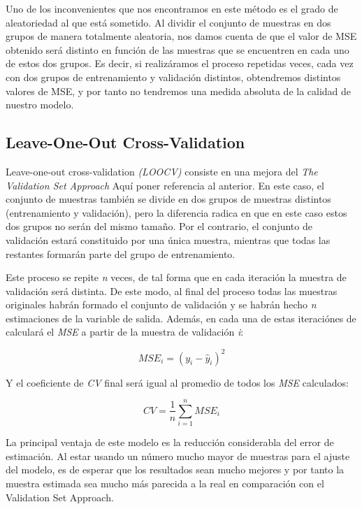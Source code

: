\documentclass[12pt,a4paper,Spanish]{book}
\begin{document}
Uno de los inconvenientes que nos encontramos en este método es el grado de aleatoriedad al que está sometido. Al dividir el conjunto de muestras en dos grupos de manera totalmente aleatoria, nos damos cuenta de que el valor de MSE obtenido será distinto en función de las muestras que se encuentren en cada uno de estos dos grupos. Es decir, si realizáramos el proceso repetidas veces, cada vez con dos grupos de entrenamiento y validación distintos, obtendremos distintos valores de MSE, y por tanto no tendremos una medida absoluta de la calidad de nuestro modelo.


\subsection{Leave-One-Out Cross-Validation}

Leave-one-out cross-validation \textit{(LOOCV)} consiste en una mejora del \textit{The Validation Set Approach} Aquí poner referencia al anterior. En este caso, el conjunto de muestras también se divide en dos grupos de muestras distintos (entrenamiento y validación), pero la diferencia radica en que en este caso estos dos grupos no serán del mismo tamaño. Por el contrario, el conjunto de validación estará constituido por una única muestra, mientras que todas las restantes formarán parte del grupo de entrenamiento.

Este proceso se repite \textit{n} veces, de tal forma que en cada iteración la muestra de validación será distinta. De este modo, al final del proceso todas las muestras originales habrán formado el conjunto de validación y se habrán hecho \textit{n} estimaciones de la variable de salida. Además, en cada una de estas iteraciónes de calculará el \textit{MSE} a partir de la muestra de validación \textit{i}:

\begin{equation}
MSE_i=(y_i-\hat{y}_i)^2
\end{equation}

Y el coeficiente de \textit{CV} final será igual al promedio de todos los \textit{MSE} calculados:

\begin{equation}
CV=\dfrac{1}{n}\sum_{i=1}^{n}MSE_i
\end{equation}

La principal ventaja de este modelo es la reducción considerabla del error de estimación. Al estar usando un número mucho mayor de muestras para el ajuste del modelo, es de esperar que los resultados sean mucho mejores y por tanto la muestra estimada sea mucho más parecida a la real en comparación con el Validation Set Approach.
\end{document}

